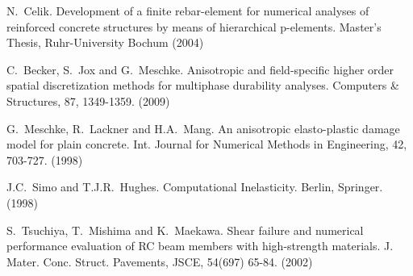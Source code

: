
\begin{thebibliography}{10}

{\sc N.~Celik}. {Development of a finite rebar-element for numerical analyses of reinforced concrete structures by means of hierarchical p-elements}. Master's Thesis, Ruhr-University Bochum (2004)

{\sc C.~Becker, S.~Jox and G.~Meschke}. {Anisotropic and field-specific higher order spatial discretization methods for multiphase durability analyses}. Computers \& Structures, 87, 1349-1359. (2009)

{\sc G.~Meschke, R.~Lackner and H.A.~Mang}. {An anisotropic elasto-plastic damage model for plain concrete}. Int. Journal for Numerical Methods in Engineering, 42, 703-727. (1998)

{\sc J.C.~Simo and T.J.R.~Hughes}. {Computational Inelasticity}. Berlin, Springer. (1998)

{\sc S.~Tsuchiya, T.~Mishima and K.~Maekawa}. {Shear failure and numerical performance evaluation of RC beam members with high-strength materials}. J. Mater. Conc. Struct. Pavements, JSCE, 54(697) 65-84. (2002)
 
\end{thebibliography}